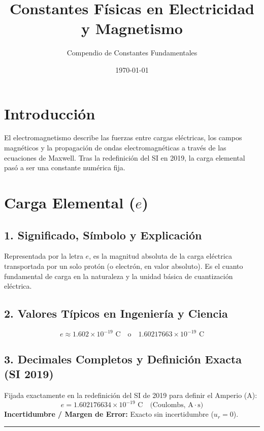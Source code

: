 \documentclass[12pt,a4paper]{article}
\title{\textbf{Constantes Físicas en Electricidad y Magnetismo}}
\author{Compendio de Constantes Fundamentales}
\date{\today}
\begin{document}
\maketitle

\section*{Introducción}
El electromagnetismo describe las fuerzas entre cargas eléctricas, los campos magnéticos y la propagación de ondas electromagnéticas a través de las ecuaciones de Maxwell. Tras la redefinición del SI en 2019, la carga elemental pasó a ser una constante numérica fija.

\section{Carga Elemental ($e$)}

\subsection*{1. Significado, Símbolo y Explicación}
Representada por la letra $e$, es la magnitud absoluta de la carga eléctrica transportada por un solo protón (o electrón, en valor absoluto). Es el cuanto fundamental de carga en la naturaleza y la unidad básica de cuantización eléctrica.

\subsection*{2. Valores Típicos en Ingeniería y Ciencia}
\begin{equation*}
e \approx 1.602 \times 10^{-19} \text{ C} \quad \text{o} \quad 1.60217663 \times 10^{-19} \text{ C}
\end{equation*}

\subsection*{3. Decimales Completos y Definición Exacta (SI 2019)}
Fijada exactamente en la redefinición del SI de 2019 para definir el Amperio (A):
\begin{equation*}
e = 1.602176634 \times 10^{-19} \text{ C} \quad \text{(Coulombs, A}\cdot\text{s)}
\end{equation*}
\textbf{Incertidumbre / Margen de Error:} Exacto sin incertidumbre ($u_r = 0$).

\vspace{0.8cm}
\hrule
\vspace{0.8cm}
\end{document}
